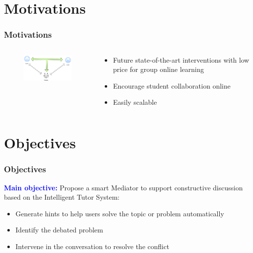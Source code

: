 \documentclass{beamer}
\begin{document}
\section{Motivations} %
\begin{frame}
\frametitle{Motivations}
\begin{columns}
	\begin{column}{.55\textwidth}
		\begin{figure}
			\includegraphics[width=55mm]{m1.png}
		\end{figure}

	\end{column}
	
	\begin{column}{.55\textwidth}
		\begin{itemize}
			\item Future state-of-the-art interventions with low price for group online learning
			\item Encourage student collaboration online
			\item Easily scalable 
		
			
		\end{itemize}
	\end{column}
\end{columns}
\end{frame}


\section{Objectives} %
\begin{frame}
\frametitle{Objectives}
{\large \textcolor{blue}{\textbf{Main objective:}}} Propose a smart Mediator to support constructive discussion based on the Intelligent Tutor System:

\begin{itemize}
	\item Generate hints to help users solve the topic or problem automatically
	\item    Identify the debated problem
	\item Intervene in the conversation to resolve the conflict
\end{itemize}

\end{frame}
\end{document}
